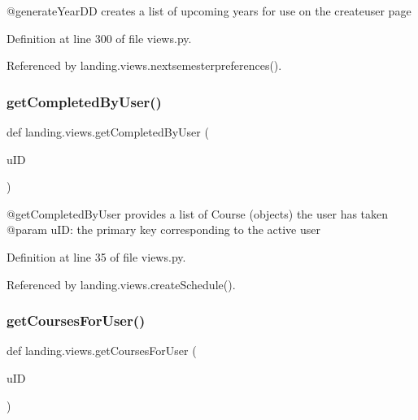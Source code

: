 \begin{DoxyVerb}@generateYearDD creates a list of upcoming years for use on the createuser page
\end{DoxyVerb}
 

Definition at line 300 of file views.\+py.



Referenced by landing.\+views.\+nextsemesterpreferences().

\mbox{\label{namespacelanding_1_1views_ab8699575ba0ef576f40bd71e73a8530f}} 
\subsubsection{\texorpdfstring{get\+Completed\+By\+User()}{getCompletedByUser()}}
{\footnotesize\ttfamily def landing.\+views.\+get\+Completed\+By\+User (\begin{DoxyParamCaption}\item[{}]{u\+ID }\end{DoxyParamCaption})}

\begin{DoxyVerb}@getCompletedByUser provides a list of Course (objects) the user has taken
@param uID: the primary key corresponding to the active user
\end{DoxyVerb}
 

Definition at line 35 of file views.\+py.



Referenced by landing.\+views.\+create\+Schedule().

\mbox{\label{namespacelanding_1_1views_a35d744b4e891af5594e09cc3d0ed42bf}} 
\subsubsection{\texorpdfstring{get\+Courses\+For\+User()}{getCoursesForUser()}}
{\footnotesize\ttfamily def landing.\+views.\+get\+Courses\+For\+User (\begin{DoxyParamCaption}\item[{}]{u\+ID }\end{DoxyParamCaption})}

